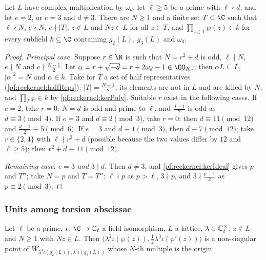 \begin{lemma}\label{pf:reckernel:kerProd}
Let $L$ have complex multiplication by $\omega_d$, let $\ell\ge5$ be a prime with $\ell\nmid d$, and let $e=2$, or $e=3$
and $d\ne3$. There are $N\ge1$ and a finite set $T\subset\C$ such that $\ell\nmid N$, $e\nmid N$, $e\nmid|T|$,
$z\notin L$ and $Nz\in L$ for all $z\in T$, and $\prod_{z\in T}\wp(z)\in k$ for every subfield $k\subseteq\C$
containing $g_2(L)$, $g_3(L)$ and $\omega_d$.
\end{lemma}

\begin{proof}
\emph{Principal case.} Suppose $r\in\N$ is such that $N=r^2+d$ is odd, $\ell\nmid N$, $e\nmid N$ and $e\nmid\frac{N-1}2$.
Let $\alpha=r+\sqrt{-d}=r+2\omega_d-1\in\OO_{K_d}$; then $\alpha L\subseteq L$, $|\alpha|^2=N$ and $\alpha\in k$. Take for
$T$ a set of half representatives (\cref{pf:reckernel:halfReps}): $|T|=\frac{N-1}2$, its elements are not in $L$
and are killed by $N$, and $\prod_T\wp\in k$ by \cref{pf:reckernel:kerPoly}. Suitable $r$ exist in the following
cases. If $e=2$, take $r=0$: $N=d$ is odd and prime to $\ell$, and $\frac{d-1}2$ is odd as $d\equiv3\pmod4$. If $e=3$
and $d\equiv2\pmod3$, take $r=0$: then $d\equiv11\pmod{12}$ and $\frac{d-1}2\equiv5\pmod6$. If $e=3$ and
$d\equiv1\pmod 3$, then $d\equiv7\pmod{12}$; take $r\in\{2,4\}$ with $\ell\nmid r^2+d$ (possible because the two
values differ by $12$ and $\ell\ge5$); then $r^2+d\equiv11\pmod{12}$.

\emph{Remaining case: $e=3$ and $3\mid d$.} Then $d\ne3$, and \cref{pf:reckernel:kerIdeal} gives $p$ and $T''$; take
$N=p$ and $T=T''$: $\ell\nmid p$ as $p>\ell$, $3\nmid p$, and $3\nmid\frac{p-1}2$ as $p\equiv2\pmod3$.
\end{proof}

\subsubsection{Units among torsion abscissae}

\begin{lemma}\label{pf:reckernel:scaledTorsion}
Let $\ell$ be a prime, $\iota\colon\C\to\reckCl$ a field isomorphism, $L$ a lattice, $\lambda\in\mathbb{C}_\ell^\times$,
$z\notin L$ and $N\ge1$ with $Nz\in L$. Then $\bigl(\lambda^2\iota(\wp(z)),\tfrac12\lambda^3\iota(\wp'(z))\bigr)$
is a non-singular point of $W_{\lambda^4\iota(g_2(L)),\lambda^6\iota(g_3(L))}$ whose $N$-th multiple is the origin.
\end{lemma}

